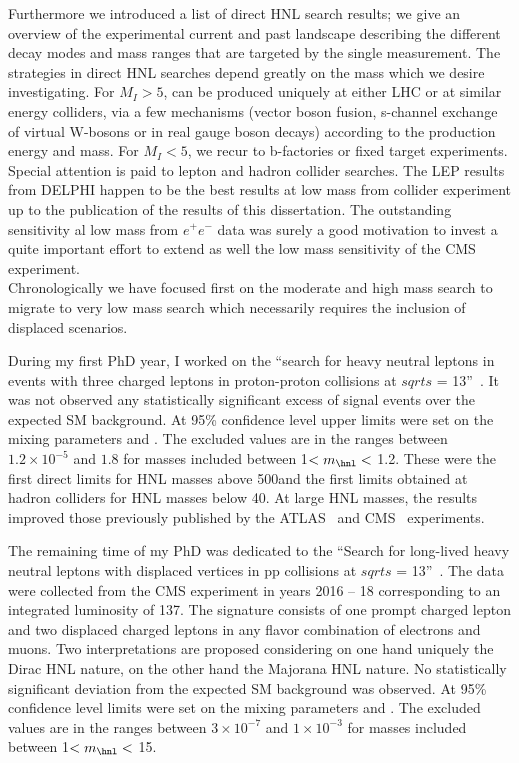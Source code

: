 Furthermore we introduced a list of direct HNL search results; we give an overview
of the experimental current and past landscape describing the different decay modes and
mass ranges that are targeted by the single measurement.
The strategies in direct HNL searches depend greatly on the mass
which we desire investigating. For $M_{I} > 5$\GeV, \hnl can be
produced uniquely at either LHC or at similar energy colliders, via a few
mechanisms (vector boson fusion, s-channel exchange of virtual
W-bosons or in real gauge boson decays) according to the production
energy and \hnl mass. For $M_{I} < 5$\GeV, we recur to b-factories
or fixed target experiments. \\
Special attention is paid to lepton and hadron collider
searches. The LEP results from DELPHI happen to be the best results at
low mass from collider experiment up to the publication of the results
of this dissertation. The outstanding sensitivity al low mass from
$e^{+}e^{-}$ data was surely a good motivation to invest a quite
important effort to extend as well the low mass sensitivity of
the CMS experiment.\\

Chronologically we have focused first on the
moderate and high mass search to migrate to very low mass search which
necessarily requires the inclusion of displaced scenarios.

During my first PhD year, I worked on the ``search for heavy neutral leptons in events with three charged
 leptons in proton-proton collisions at $sqrt{s}$ =
 13\TeV''~\cite{Sirunyan:2018mtv}. It was not observed any
 statistically significant excess of signal events over the expected
SM background. At 95\% confidence level upper limits were set on the mixing
parameters \mixpare and \mixparm. The excluded values are in the
ranges between $1.2\times 10^{-5}$ and $1.8$ for masses included
between 1\GeV $< m_\hnl <$ 1.2\TeV. 
These were the first direct limits for HNL masses above 500\GeV and the first
limits obtained at hadron colliders for HNL masses below 40\GeV.
At large HNL masses, the results improved those previously published
by the ATLAS~\cite{Aad_2015} and CMS~\cite{Khachatryan_2015,Sirunyan:2018xiv}
experiments. 

The remaining time of my PhD was dedicated to the ``Search for long-lived heavy neutral leptons with displaced
vertices in pp collisions at $sqrt{s}$ =
 13\TeV''~\cite{CMS-PAS-EXO-20-009}. The data were collected from the
CMS experiment in years 2016 -- 18 corresponding to an integrated
luminosity of 137\fbinv.
The signature consists of one prompt charged lepton and two displaced
charged leptons in any flavor combination of electrons
and muons. Two interpretations are proposed considering on one hand uniquely the
Dirac HNL nature, on the other hand the Majorana HNL nature. 
No statistically significant deviation from the expected
SM background was observed. At 95\% confidence level limits were set on the mixing
parameters \mixpare and \mixparm.
The excluded values are in the
ranges between $3\times 10^{-7}$ and $1\times 10^{-3}$ for masses included
between 1\GeV $< m_\hnl <$ 15\GeV. \\

